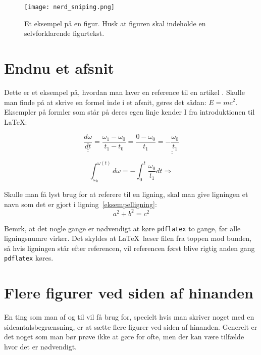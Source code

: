 \documentclass[a4paper,twoside]{article}
\begin{document}
\begin{figure}
\begin{centering}
\texttt{[image: nerd\_sniping.png]}
\par\end{centering}
\caption{\label{cap:nerd_sniping}Et eksempel på en figur. Husk at figuren skal indeholde en selvforklarende figurtekst.}
\end{figure}

\section{Endnu et afsnit}

Dette er et eksempel på, hvordan man laver en reference til en artikel \cite{collins2000}. Skulle man finde på at skrive en formel inde i et afsnit, gøres det sådan: $E=mc^2$. Eksempler på formler som står på deres egen linje kender I fra introduktionen til \LaTeX:

\begin{equation}
\underline{\underline{\frac{d\omega}{dt}}}=\frac{\omega_1 - \omega_0}{t_1 - t_0}=\frac{0-\omega_0}{t_1}=\underline{\underline{-\frac{\omega_0}{t_1}}}
\end{equation}

\[
\int^{\omega(t)}_{\omega_0}d\omega=-\int^t_0\frac{\omega_0}{t_1}dt\Rightarrow
\]

Skulle man få lyst brug for at referere til en ligning, skal man give ligningen et navn som det er gjort i ligning~\eqref{eksempelligning}:
\begin{equation}
a^2+b^2=c^2 \label{eksempelligning}
\end{equation}

Bemrk, at det nogle gange er nødvendigt at køre \texttt{pdflatex} to gange, før alle ligningsnumre virker. Det skyldes at \LaTeX\ læser filen fra toppen mod bunden, så hvis ligningen står efter referencen, vil referencen først blive rigtig anden gang \texttt{pdflatex} køres.

\section{Flere figurer ved siden af hinanden}

En ting som man af og til vil få brug for, specielt hvis man skriver noget med en sideantalsbegrænsning, er at sætte flere figurer ved siden af hinanden. Generelt er det noget som man bør prøve ikke at gøre for ofte, men der kan være tilfælde hvor det er nødvendigt.
\end{document}
